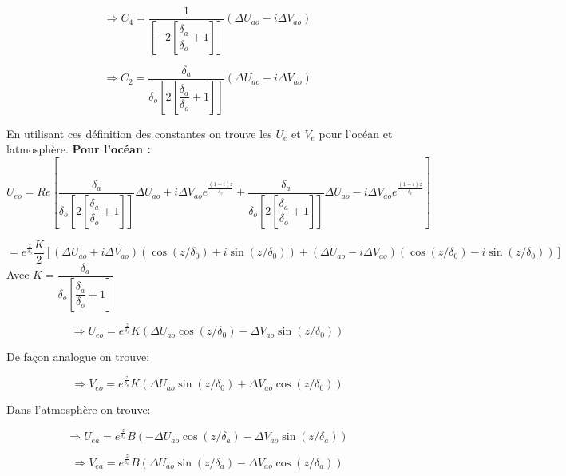 \documentclass[11pt,a4paper,titlepage]{article}
\begin{document}
\begin{equation}
\Rightarrow C_4 =\dfrac{1}{\left[-2\left[\dfrac{\delta_a}{\delta_o}+1\right]\right] } (\Delta U_{ao} - i \Delta V_{ao}) 
\end{equation}

\begin{equation}
\Rightarrow C_2 =\dfrac{\delta_a}{\delta_o \left[2\left[\dfrac{\delta_a}{\delta_o}+1\right]\right] } (\Delta U_{ao} -  i \Delta V_{ao})
\end{equation}

En utilisant ces définition des constantes on trouve les $U_e$ et $V_e$ pour l'océan et latmosphère.
\textbf{Pour l'océan :}
\begin{equation}
U_{eo} = Re \left[ \dfrac{\delta_a}{\delta_o \left[2\left[\dfrac{\delta_a}{\delta_o}+1\right]\right] } \Delta U_{ao} + i \Delta V_{ao}  e^{\frac{(1+i)z}{\delta_e}}+\dfrac{\delta_a}{\delta_o \left[2\left[\dfrac{\delta_a}{\delta_o}+1\right]\right] } \Delta U_{ao} -  i \Delta V_{ao} e^{\frac{(1-i)z}{\delta_e}} \right] 
\end{equation}


\begin{equation}
=  e^{\frac{z}{\delta_o}} \frac{K}{2}  \left[(\Delta U_{ao} +  i \Delta V_{ao})(\cos(z/\delta_0)+i \sin(z/\delta_0)) + (\Delta U_{ao} -  i \Delta V_{ao}) (\cos(z/\delta_0) - i \sin(z/\delta_0)) \right] 
\end{equation}
 Avec $K =  \dfrac{\delta_a}{\delta_o \left[\dfrac{\delta_a}{\delta_o}+1 \right]  }$

\begin{equation}
\Rightarrow U_{eo} =  e^{\frac{z}{\delta_o}} K (\Delta U_{ao} \cos(z/\delta_0) -\Delta V_{ao} \sin(z/\delta_0))
\end{equation}

De façon analogue on trouve:

\begin{equation}
\Rightarrow V_{eo} =   e^{\frac{z}{\delta_o}} K (\Delta U_{ao} \sin(z/\delta_0) + \Delta V_{ao} \cos(z/\delta_0))
\end{equation}

Dans l'atmosphère on trouve: 

\begin{equation}
\Rightarrow U_{ea} =  e^{\frac{z}{\delta_a}} B (- \Delta U_{ao} \cos(z/\delta_a) - \Delta V_{ao}  \sin(z/\delta_a))
\end{equation}


\begin{equation}
\Rightarrow V_{ea} =   e^{\frac{z}{\delta_a}} B (\Delta U_{ao} \sin(z/\delta_a) - \Delta V_{ao} \cos(z/\delta_a))
\end{equation}
\end{document}
